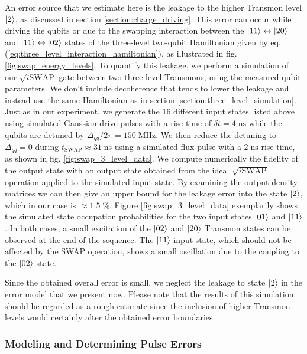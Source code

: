 An error source that we estimate here is the leakage to the higher Transmon level $\left| 2 \right>$, as discussed in section \ref{section:charge_driving}. This error can occur while driving the qubits or due to the swapping interaction between the $\left| 11 \right>\leftrightarrow\left| 20 \right>$ and $\left| 11 \right>\leftrightarrow\left| 02 \right>$ states of the three-level two-qubit Hamiltonian given by eq. (\ref{eq:three_level_interaction_hamiltonian}), as illustrated in fig. \ref{fig:swap_energy_levels}. To quantify this leakage, we perform a simulation of our $\sqrt{i\mathrm{SWAP}}$ gate between two three-level Transmons, using the measured qubit parameters. We don't include decoherence that tends to lower the leakage and instead use the same Hamiltonian as in section \ref{section:three_level_simulation}. Just as in our experiment, we generate the 16 different input states listed above using simulated Gaussian drive pulses with a rise time of $\delta t = 4\;\mathrm{ns}$ while the qubits are detuned by $\Delta_{qq}/2\pi = 150\;\mathrm{MHz}$. We then reduce the detuning to $\Delta_{qq} = 0$ during $t_\mathrm{SWAP}\approx 31 \;\mathrm{ns}$ using a simulated flux pulse with a $2\;\mathrm{ns}$ rise time, as shown in fig. \ref{fig:swap_3_level_data}. We compute numerically the fidelity of the output state with an output state obtained from the ideal $\sqrt{i\mathrm{SWAP}}$ operation applied to the simulated input state. By examining the output density matrices we can then give an upper bound for the leakage error into the state $\left| 2 \right>$, which in our case is $\approx 1.5\;\%$. Figure \ref{fig:swap_3_level_data} exemplarily shows the simulated state occupation probabilities for the two input states $\left| 01 \right>$ and $\left| 11 \right>$. In both cases, a small excitation of the $\left| 02 \right>$ and $\left| 20 \right>$ Transmon states can be observed at the end of the sequence. The $\left| 11 \right>$ input state, which should not be affected by the SWAP operation, shows a small oscillation due to the coupling to the $\left| 02 \right>$ state.

\smallskip

Since the obtained overall error is small, we neglect the leakage to state $\left| 2 \right>$ in the error model that we present now. Please note that the results of this simulation should be regarded as a rough estimate since the inclusion of higher Transmon levels would certainly alter the obtained error boundaries.

\subsubsection{Modeling and Determining Pulse Errors} \label{section:tomographic_errors}

